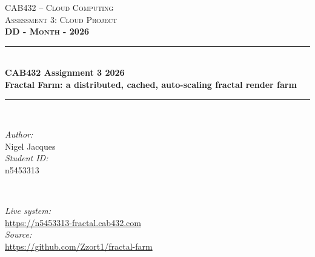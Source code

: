 \documentclass[a4paper,12pt]{article}
\newcommand{\Hrule}{\rule{\linewidth}{0.5mm}}
\begin{document}

\thispagestyle{empty}
\begin{titlepage}
    \center
    \vspace*{0.5cm}
    \vspace{0.4cm}

    \textsc{\Large CAB432 -- Cloud Computing}\\[1.0cm]
    \textsc{\large Assessment 3: Cloud Project}\\[1.0cm]
    \textsc{\large{\textbf{DD - Month - 2026}}}\\[1.0cm]

    \Hrule \\[0.9cm]
    {\Huge \bfseries CAB432 Assignment 3 2026}\\[0.35cm]
    {\Large \bfseries Fractal Farm: a distributed, cached, auto-scaling fractal render farm}\\[0.4cm]
    \Hrule \\[1.1cm]

    \begin{minipage}{0.45\textwidth}
        \begin{flushleft} \Large
            \emph{Author:}\\
            Nigel Jacques\\[0.1cm]
            \emph{Student ID:}\\
            n5453313
        \end{flushleft}
    \end{minipage}
    ~
    \begin{minipage}{0.45\textwidth}
        \begin{flushright} \Large
            \emph{Live system:}\\
            \small\url{https://n5453313-fractal.cab432.com}\\[0.1cm]
            \Large\emph{Source:}\\
            \small\url{https://github.com/Zzort1/fractal-farm}
        \end{flushright}
    \end{minipage}

    \vspace{1.0cm}


\end{titlepage}
\end{document}
